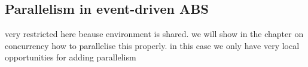 \subsection{Parallelism in event-driven ABS}
very restricted here beause environment is shared. we will show in the chapter on concurrency how to parallelise this properly. in this case we only have very local opportunities for adding parallelism